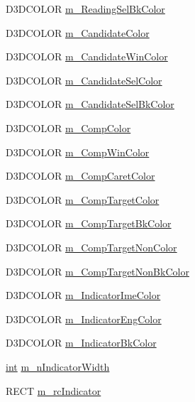 \begin{DoxyCompactItemize}
D3DCOLOR \hyperlink{class_c_d_x_u_t_i_m_e_edit_box_ae63f71f182df873c2126c0c6d416ac90}{m\_\-ReadingSelBkColor}
\item 
D3DCOLOR \hyperlink{class_c_d_x_u_t_i_m_e_edit_box_a8b8a608af08e7fb7ec24200a892779d8}{m\_\-CandidateColor}
\item 
D3DCOLOR \hyperlink{class_c_d_x_u_t_i_m_e_edit_box_a3c5516213f115dc7d518f4de53cfbf71}{m\_\-CandidateWinColor}
\item 
D3DCOLOR \hyperlink{class_c_d_x_u_t_i_m_e_edit_box_a371964cf3f276e8a2bc844dafb8c63c2}{m\_\-CandidateSelColor}
\item 
D3DCOLOR \hyperlink{class_c_d_x_u_t_i_m_e_edit_box_a5fc0a54d7470b0fef69ef6f3b5d3d9b1}{m\_\-CandidateSelBkColor}
\item 
D3DCOLOR \hyperlink{class_c_d_x_u_t_i_m_e_edit_box_a43d97af287e09d32fe03c9ec2a28d5ea}{m\_\-CompColor}
\item 
D3DCOLOR \hyperlink{class_c_d_x_u_t_i_m_e_edit_box_a176310771bab6938087f89b678400ba2}{m\_\-CompWinColor}
\item 
D3DCOLOR \hyperlink{class_c_d_x_u_t_i_m_e_edit_box_a16acb29b8433a114b9e56319d54dd418}{m\_\-CompCaretColor}
\item 
D3DCOLOR \hyperlink{class_c_d_x_u_t_i_m_e_edit_box_ac03e89b53c4bcc8574aba818a8f53ade}{m\_\-CompTargetColor}
\item 
D3DCOLOR \hyperlink{class_c_d_x_u_t_i_m_e_edit_box_abab28401ad563686e82cd22324bdfc71}{m\_\-CompTargetBkColor}
\item 
D3DCOLOR \hyperlink{class_c_d_x_u_t_i_m_e_edit_box_ad1285ec420c985d70b5bdb093da16594}{m\_\-CompTargetNonColor}
\item 
D3DCOLOR \hyperlink{class_c_d_x_u_t_i_m_e_edit_box_a7bf58b958e0e9dc439c4e3c5f75998b0}{m\_\-CompTargetNonBkColor}
\item 
D3DCOLOR \hyperlink{class_c_d_x_u_t_i_m_e_edit_box_a38ca1864482d5a7f0b021f3c223a7cce}{m\_\-IndicatorImeColor}
\item 
D3DCOLOR \hyperlink{class_c_d_x_u_t_i_m_e_edit_box_ac905236eb64b937da8a2756bd78473ae}{m\_\-IndicatorEngColor}
\item 
D3DCOLOR \hyperlink{class_c_d_x_u_t_i_m_e_edit_box_a19e7f372fee68a764208a5d7f32d7e37}{m\_\-IndicatorBkColor}
\item 
\hyperlink{_d_x_u_tgui_8cpp_a2d77ed03302b6978834ee3b6f57837fb}{int} \hyperlink{class_c_d_x_u_t_i_m_e_edit_box_af69a3a78e89ed011a11c9ae3d19bbb66}{m\_\-nIndicatorWidth}
\item 
RECT \hyperlink{class_c_d_x_u_t_i_m_e_edit_box_a0cd04d0239f03ac23bb29da73b2c1f32}{m\_\-rcIndicator}
\end{DoxyCompactItemize}
